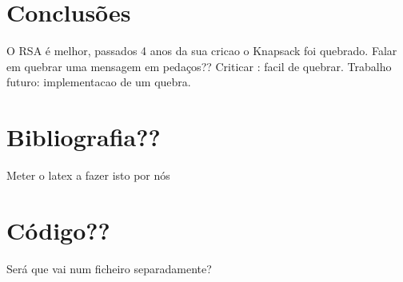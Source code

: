 \documentclass[11pt]{report}
\begin{document}
\chapter{Conclusões}

O RSA é melhor, passados 4 anos da sua cricao o Knapsack foi quebrado.
Falar em quebrar uma mensagem em pedaços?? 
Criticar : facil de quebrar.
Trabalho futuro: implementacao de um quebra.

\chapter{Bibliografia??}

Meter o latex a fazer isto por nós

\appendix

\chapter{Código??}

Será que vai num ficheiro separadamente?
\end{document}
